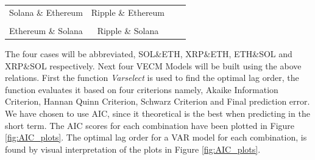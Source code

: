 \pause
\begin{center}
\begin{tabular}{cccc}
   Solana \& Ethereum \quad & \quad Ripple \& Ethereum\\\\
   Ethereum \& Solana \quad & \quad Ripple \& Solana
\end{tabular}
\end{center}
\pause
\noindent The four cases will be abbreviated, SOL\&ETH, XRP\&ETH, ETH\&SOL and XRP\&SOL respectively. Next four VECM Models will be built using the above relations. First the function \textit{Varselect} is used to find the optimal lag order, the function evaluates it based on four criterions namely, Akaike Information Criterion, Hannan Quinn Criterion, Schwarz Criterion and Final prediction error. We have chosen to use AIC, since it theoretical is the best when predicting in the short term. The AIC scores for each combination have been plotted in Figure \ref{fig:AIC_plots}. The optimal lag order for a VAR model for each combination, is found by visual interpretation of the plots in Figure \ref{fig:AIC_plots}.
